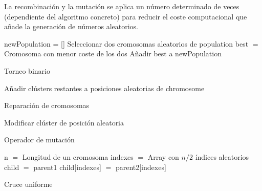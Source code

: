 \vspace{\baselineskip}

La recombinación y la mutación se aplica un número determinado de veces (dependiente del algoritmo concreto) para reducir el coste computacional que añade la generación de números aleatorios. \\

\begin{algorithm}[H]
    \SetAlgoLined
        newPopulation = [] \;
         {
            Seleccionar dos cromosomas aleatorios de population \;
            best $=$ Cromosoma con menor coste de los dos \;
            Añadir best a newPopulation \;
        }
    \caption{Torneo binario}
\end{algorithm}

\vspace{\baselineskip}

\begin{algorithm}[H]
    \SetAlgoLined
         {
            Añadir clústers restantes a posiciones aleatorias de chromosome \;
        }
    \caption{Reparación de cromosomas}
\end{algorithm}

\vspace{\baselineskip}

\begin{algorithm}[H]
    \SetAlgoLined
         {
            Modificar clúster de posición aleatoria \;
        }
    \caption{Operador de mutación}
\end{algorithm}

\vspace{\baselineskip}


\begin{algorithm}[H]
    \SetAlgoLined
        n $=$ Longitud de un cromosoma \;
        indexes $=$ Array con $n/2$ índices aleatorios \;
        child $=$ parent1 \;
        child[indexes] $=$ parent2[indexes] \;
    \caption{Cruce uniforme}
\end{algorithm}

\vspace{\baselineskip}

